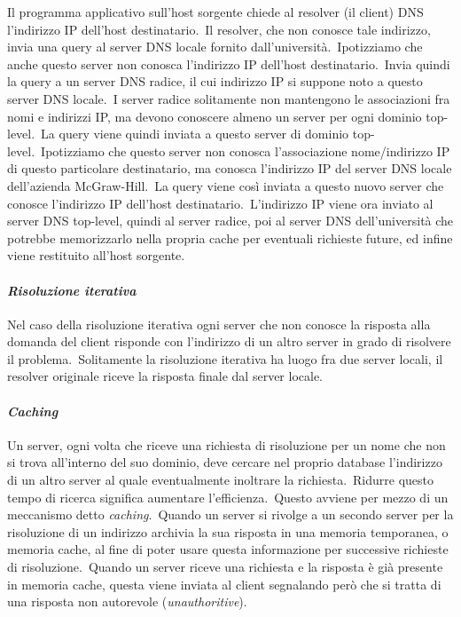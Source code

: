 Il programma applicativo sull'host sorgente chiede al resolver (il client) DNS l'indirizzo IP dell'host destinatario.\
Il resolver, che non conosce tale indirizzo, invia una query al server DNS locale fornito dall'università.\
Ipotizziamo che anche questo server non conosca l'indirizzo IP dell'host destinatario.\
Invia quindi la query a un server DNS radice, il cui indirizzo IP si suppone noto a questo server DNS locale.\
I server radice solitamente non mantengono le associazioni fra nomi e indirizzi IP, ma devono conoscere almeno un server per ogni dominio top-level.\
La query viene quindi inviata a questo server di dominio top-level.\
Ipotizziamo che questo server non conosca l'associazione nome/indirizzo IP di questo particolare destinatario, ma conosca l'indirizzo IP del server DNS locale dell'azienda McGraw-Hill.\
La query viene così inviata a questo nuovo server che conosce l'indirizzo IP dell'host destinatario.\
L'indirizzo IP viene ora inviato al server DNS top-level, quindi al server radice, poi al server DNS dell'università che potrebbe memorizzarlo nella propria cache per eventuali richieste future, ed infine viene restituito all'host sorgente.

\paragraph{\emph{Risoluzione iterativa}}

Nel caso della risoluzione iterativa ogni server che non conosce la risposta alla domanda del client risponde con l'indirizzo di un altro server in grado di risolvere il problema.\
Solitamente la risoluzione iterativa ha luogo fra due server locali, il resolver originale riceve la risposta finale dal server locale.

\paragraph{\emph{Caching}}

Un server, ogni volta che riceve una richiesta di risoluzione per un nome che non si trova all'interno del suo dominio, deve cercare nel proprio database l'indirizzo di un altro server al quale eventualmente inoltrare la richiesta.\
Ridurre questo tempo di ricerca significa aumentare l'efficienza.\
Questo avviene per mezzo di un meccanismo detto \emph{caching}.\
Quando un server si rivolge a un secondo server per la risoluzione di un indirizzo archivia la sua risposta in una memoria temporanea, o memoria cache, al fine di poter usare questa informazione per successive richieste di risoluzione.\
Quando un server riceve una richiesta e la risposta è già presente in memoria cache, questa viene inviata al client segnalando però che si tratta di una risposta non autorevole (\emph{unauthoritive}).


